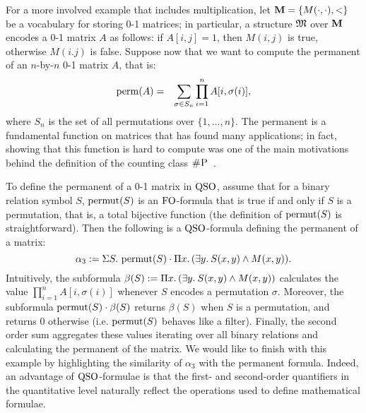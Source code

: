 \begin{example}\label{exa-perm}
For a more involved example that includes multiplication, let $\mathbf{M} = \{M(\cdot,\cdot),<\}$ be a vocabulary for storing 0-1 matrices; in particular, a structure $\mathfrak{M}$ over $\mathbf{M}$ encodes a 0-1 matrix $A$ as follows: if $A[i,j] = 1$, then $M(i,j)$ is true, otherwise $M(i.j)$ is false.
Suppose now that we want to compute the permanent of an $n$-by-$n$ 0-1 matrix $A$, that is:
\begin{eqnarray*}
\operatorname{perm}(A) & = & \sum_{\sigma \in S_n} \prod_{i=1}^n A[i, \sigma(i)],  
\end{eqnarray*}
where $S_n$ is the set of all permutations over $\{1, \ldots, n\}$.
The permanent is a fundamental function on matrices that has found many applications;
in fact, showing that this function is hard to compute was one of the main motivations behind the definition of the counting class $\text{\sc \#P}$~\cite{Valiant79}.

To define the permanent of a 0-1 matrix in ${\rm QSO}$, assume that for a binary relation symbol $S$, $\operatorname{permut}(S)$ is an ${\rm FO}$-formula that is true if and only if $S$ is a permutation, that is, a total bijective function (the definition of $\operatorname{permut}(S)$ is straightforward).
Then the following is a ${\rm QSO}$-formula defining the permanent of a matrix:
\[
\alpha_3 := \Sigma{S}.\, \operatorname{permut}(S) \cdot \Pi{x}.\, (\exists{y}.\: S(x,y) \wedge M(x,y)).
\]
Intuitively, the subformula $\beta(S) := \Pi{x}.\, (\exists{y}.\: S(x,y) \wedge M(x,y))$ calculates the value $\prod_{i=1}^n A[i, \sigma(i)]$ whenever $S$ encodes a permutation $\sigma$.
Moreover, the subformula $\operatorname{permut}(S) \cdot \beta(S)$ returns $\beta(S)$ when $S$ is a permutation, and returns $0$ otherwise (i.e. $\operatorname{permut}(S)$ behaves like a filter). 
Finally, the second order sum aggregates these values iterating over all binary relations and calculating the permanent of the matrix.
We would like to finish with this example by highlighting the similarity of $\alpha_3$ with the permanent formula. 
Indeed, an advantage of ${\rm QSO}$-formulae is that the first- and second-order quantifiers in the quantitative level naturally reflect the operations used to define mathematical formulae.
\end{example}

